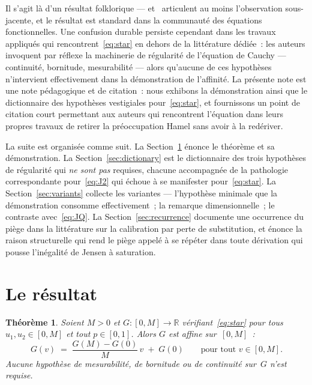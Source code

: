 \documentclass[11pt,a4paper]{amsart}
\newtheorem{theorem}{Théorème}
\newcommand{\R}{\mathbb R}
\begin{document}
Il s'agit là d'un résultat folklorique --- \cite{Aczel1966}
et~\cite{Kuczma2009} articulent au moins l'observation sous-jacente, et le
résultat est standard dans la communauté des équations fonctionnelles. Une
confusion durable persiste cependant dans les travaux appliqués qui
rencontrent~\eqref{eq:star} en dehors de la littérature dédiée~: les
auteurs invoquent par réflexe la machinerie de régularité de l'équation de
Cauchy --- continuité, bornitude, mesurabilité --- alors qu'aucune de ces
hypothèses n'intervient effectivement dans la démonstration de l'affinité.
La présente note est une note pédagogique et de citation~: nous exhibons
la démonstration ainsi que le dictionnaire des hypothèses vestigiales
pour~\eqref{eq:star}, et fournissons un point de citation court permettant
aux auteurs qui rencontrent l'équation dans leurs propres travaux de
retirer la préoccupation Hamel sans avoir à la redériver.

La suite est organisée comme suit. La Section~\ref{sec:result} énonce le
théorème et sa démonstration. La Section~\ref{sec:dictionary} est le
dictionnaire des trois hypothèses de régularité qui \emph{ne sont pas}
requises, chacune accompagnée de la pathologie correspondante
pour~\eqref{eq:J2} qui échoue à se manifester pour~\eqref{eq:star}. La
Section~\ref{sec:variants} collecte les variantes --- l'hypothèse minimale
que la démonstration consomme effectivement~; la remarque dimensionnelle~;
le contraste avec~\eqref{eq:JQ}. La Section~\ref{sec:recurrence} documente
une occurrence du piège dans la littérature sur la calibration par perte
de substitution, et énonce la raison structurelle qui rend le piège appelé
à se répéter dans toute dérivation qui pousse l'inégalité de Jensen à
saturation.

\section{Le résultat}
\label{sec:result}

\begin{theorem}
\label{thm:main}
Soient $M > 0$ et $G\colon[0,M]\to\R$ vérifiant~\eqref{eq:star} pour tous
$u_1,u_2\in[0,M]$ et tout $p\in[0,1]$. Alors $G$ est affine sur~$[0,M]$~:
\[
G(v) \;=\; \frac{G(M) - G(0)}{M}\,v \;+\; G(0)
\qquad \text{pour tout } v \in [0, M].
\]
Aucune hypothèse de mesurabilité, de bornitude ou de continuité sur~$G$
n'est requise.
\end{theorem}
\end{document}
